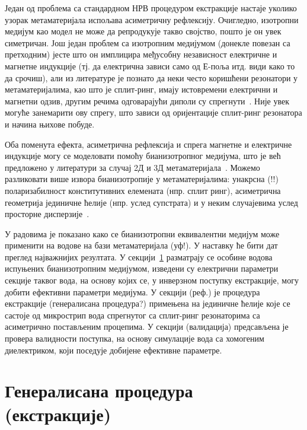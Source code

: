 Један од проблема са стандардном НРВ процедуром екстракције настаје уколико узорак метаматеријала испољава асиметричну рефлексију. Очигледно, изотропни медијум као модел не може да репродукује такво својство, пошто је он увек симетричан. Још један проблем са изотропним медијумом (донекле повезан са претходним) јесте што он имплицира међусобну независност електричне и магнетне индукције (тј. да електрична зависи само од Е-поља итд. види како то да срочиш), али из литературе је познато да неки често коришћени резонатори у метаматеријалима, као што је сплит-ринг, имају истовремени електрични и магнетни одзив, другим речима одговарајући диполи су спрегнути~\cite{marques}. Није увек могуће занемарити ову спрегу, што зависи од оријентације сплит-ринг резонатора и начина њихове побуде.

Оба поменута ефекта, асиметрична рефлексија и спрега магнетне и електричне индукције могу се моделовати помоћу бианизотропног медијума, што је већ предложено у литератури за случај 2Д и 3Д метаматеријала~\cite{chen:05,kriegler,shalaev}. Можемо разликовати више извора бианизотропије у метаматеријалима: унакрсна (!!) поларизабилност конститутивних елемената (нпр. сплит ринг), асиметрична геометрија јединичне ћелије (нпр. услед супстрата) и у неким случајевима услед просторне дисперзије~\cite{alu2}.

У радовима \cite{bian_mtt,bian_physcr} је показано како се бианизотропни еквивалентни медијум може применити на водове на бази метаматеријала (уф!). У наставку ће бити дат преглед најважнијих резултата. У секцији~\ref{sekc2} разматрају се особине водова испуњених бианизотропним медијумом, изведени су електрични параметри секције таквог вода, на основу којих се, у инверзном поступку екстракције, могу добити ефективни параметри медијума. У секцији (реф.) је процедура екстракције (генералисана процедура?) примењена на јединичне ћелије које се састоје од микрострип вода спрегнутог са сплит-ринг резонаторима са асиметрично постављеним процепима. У секцији (валидација) предсављена је провера валидности поступка, на основу симулације вода са хомогеним диелектриком, који поседује добијене ефективне параметре.


\section{Генералисана процедура (екстракције)}\label{sekc2}
